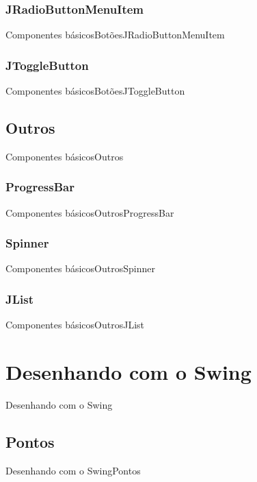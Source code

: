 \documentclass[10pt]{beamer}
\begin{document}
\subsubsection{JRadioButtonMenuItem}
\begin{frame}{Componentes básicos}{Botões}{JRadioButtonMenuItem}
\end{frame}{}
\subsubsection{JToggleButton}
\begin{frame}{Componentes básicos}{Botões}{JToggleButton}
\end{frame}{}
\subsection{Outros}
\begin{frame}{Componentes básicos}{Outros}
\end{frame}{}
\subsubsection{ProgressBar}
\begin{frame}{Componentes básicos}{Outros}{ProgressBar}
\end{frame}{}
\subsubsection{Spinner}
\begin{frame}{Componentes básicos}{Outros}{Spinner}
\end{frame}{}
\subsubsection{JList}
\begin{frame}{Componentes básicos}{Outros}{JList}
\end{frame}{}
\section{Desenhando com o Swing}
\begin{frame}{Desenhando com o Swing}{}
\end{frame}{}
\subsection{Pontos}
\begin{frame}{Desenhando com o Swing}{Pontos}
\end{frame}{}
\end{document}
